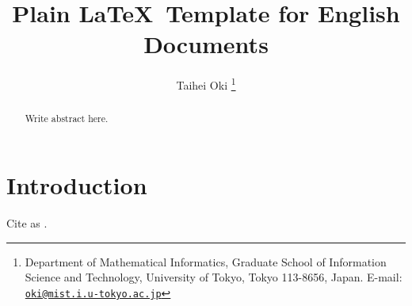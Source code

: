 \documentclass[11pt,a4paper]{article}
\title{\texorpdfstring{%
  Plain \LaTeX\ Template for English Documents
}{%
  Plain LaTeX Template for English Documents
}}
\author{Taihei Oki%
  \texorpdfstring{\thanks{
    Department of Mathematical Informatics, Graduate School of Information Science and Technology, University of Tokyo, Tokyo 113-8656, Japan.
    E-mail: \href{mailto:oki@mist.i.u-tokyo.ac.jp}{\nolinkurl{oki@mist.i.u-tokyo.ac.jp}}
  }}{}
}
\theoremstyle{definition}
\begin{document}
\maketitle

\begin{abstract}

Write abstract here.

\end{abstract}

\section{Introduction}
Cite as \citep{Adams1995}.

\printbibliography[heading=bibintoc]
\end{document}
